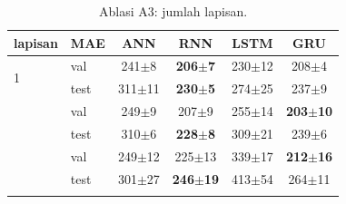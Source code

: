 \begin{table}[t]
\centering
\scriptsize
\caption{Ablasi A3: jumlah lapisan.}
\label{tab:A3}
\setlength{\tabcolsep}{3pt}
\begin{tabular}{@{}llcccc@{}}
\toprule
lapisan & MAE & ANN & RNN & LSTM & GRU \\
\midrule
\multirow{2}{*}{1} & val & 241$\pm$8 & \textbf{206$\pm$7} & 230$\pm$12 & 208$\pm$4 \\
 & test & 311$\pm$11 & \textbf{230$\pm$5} & 274$\pm$25 & 237$\pm$9 \\
\addlinespace[1pt]
\multirow{2}{*}{2} & val & 249$\pm$9 & 207$\pm$9 & 255$\pm$14 & \textbf{203$\pm$10} \\
 & test & 310$\pm$6 & \textbf{228$\pm$8} & 309$\pm$21 & 239$\pm$6 \\
\addlinespace[1pt]
\multirow{2}{*}{3} & val & 249$\pm$12 & 225$\pm$13 & 339$\pm$17 & \textbf{212$\pm$16} \\
 & test & 301$\pm$27 & \textbf{246$\pm$19} & 413$\pm$54 & 264$\pm$11 \\
\addlinespace[1pt]
\bottomrule
\end{tabular}
\end{table}
